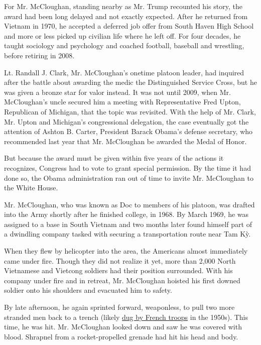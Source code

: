 For Mr. McCloughan, standing nearby as Mr. Trump recounted his story,
the award had been long delayed and not exactly expected. After he
returned from Vietnam in 1970, he accepted a deferred job offer from
South Haven High School and more or less picked up civilian life where
he left off. For four decades, he taught sociology and psychology and
coached football, baseball and wrestling, before retiring in 2008.

Lt. Randall J. Clark, Mr. McCloughan's onetime platoon leader, had
inquired after the battle about awarding the medic the Distinguished
Service Cross, but he was given a bronze star for valor instead. It was
not until 2009, when Mr. McCloughan's uncle secured him a meeting with
Representative Fred Upton, Republican of Michigan, that the topic was
revisited. With the help of Mr. Clark, Mr. Upton and Michigan's
congressional delegation, the case eventually got the attention of
Ashton B. Carter, President Barack Obama's defense secretary, who
recommended last year that Mr. McCloughan be awarded the Medal of Honor.

But because the award must be given within five years of the actions it
recognizes, Congress had to vote to grant special permission. By the
time it had done so, the Obama administration ran out of time to invite
Mr. McCloughan to the White House.

Mr. McCloughan, who was known as Doc to members of his platoon, was
drafted into the Army shortly after he finished college, in 1968. By
March 1969, he was assigned to a base in South Vietnam and two months
later found himself part of a dwindling company tasked with securing a
transportation route near Tam Kỳ.

When they flew by helicopter into the area, the Americans almost
immediately came under fire. Though they did not realize it yet, more
than 2,000 North Vietnamese and Vietcong soldiers had their position
surrounded. With his company under fire and in retreat, Mr. McCloughan
hoisted his first downed soldier onto his shoulders and evacuated him to
safety.

By late afternoon, he again sprinted forward, weaponless, to pull two
more stranded men back to a trench (likely
\href{https://www.google.com/url?q=https\%3A\%2F\%2Fwww.army.mil\%2Farticle\%2F191325\%2Fcombat_medic_to_receive_medal_of_honor_for_intrepid_actions_in_vietnam\&sa=D\&sntz=1\&usg=AFQjCNHiZL3UKXF2Bg27FWeQsU99UC3fiQ}{dug
by French troops} in the 1950s). This time, he was hit. Mr. McCloughan
looked down and saw he was covered with blood. Shrapnel from a
rocket-propelled grenade had hit his head and body.

